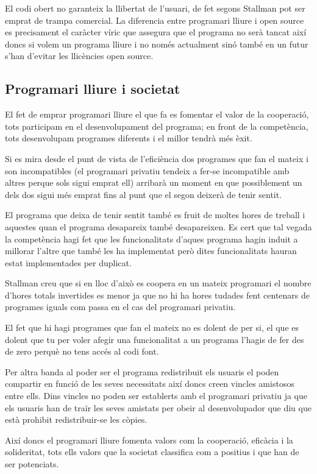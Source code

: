 \documentclass[a4paper,11pt]{scrartcl}
\begin{document}
El codi obert no garanteix la llibertat de l'usuari, de fet segons Stallman
pot ser emprat de trampa comercial. La diferencia entre programari lliure
i open source es precisament el caràcter víric que assegura que el programa
no serà tancat així doncs si volem un programa lliure i no només actualment
sinó també en un futur s'han d'evitar les llicències open source.


\subsection{Programari lliure i societat}
El fet de emprar programari lliure el que fa es fomentar el valor de la cooperació,
tots participam en el desenvolupament del programa; en front de la competència,
tots desenvolupam programes diferents i el millor tendrà més èxit.

Si es mira desde el punt de vista de l'eficiència dos programes que fan el
mateix i son incompatibles (el programari privatiu tendeix a fer-se incompatible
amb altres perque sols sigui emprat ell) arribarà un moment en que possiblement
un dels dos sigui més emprat fins al punt que el segon deixerà de tenir sentit.

El programa que deixa de tenir sentit també es fruit de moltes hores de treball
i aquestes quan el programa desapareix també desapareixen. Es cert que tal
vegada la competència hagi fet que les funcionalitats d'aques programa
hagin induit a millorar l'altre que també les ha implementat però dites
funcionalitats hauran estat implementades per duplicat.

Stallman creu que si en lloc d'això es coopera en un mateix programari el nombre
d'hores totals invertides es menor ja que no hi ha hores tudades fent centenars
de programes iguals com passa en el cas del programari privatiu.

El fet que hi hagi programes que fan el mateix no es dolent de per si,
el que es dolent que tu per voler afegir una funcionalitat a un programa
l'hagis de fer des de zero perquè no tens accés al codi font.

Per altra banda al poder ser el programa redistribuit els usuaris el
poden compartir en funció de les seves necessitats així doncs creen
vincles amistosos entre ells. Dins vincles no poden ser establerts
amb el programari privatiu ja que els usuaris han de traïr les seves
amistats per obeir al desenvolupador que diu que està prohibit redistribuir-se les còpies.

Així doncs el programari lliure fomenta valors com la cooperació, eficàcia i la solideritat,
tots ells valors que la societat classifica com a positius i que han de ser potenciats.
\end{document}
